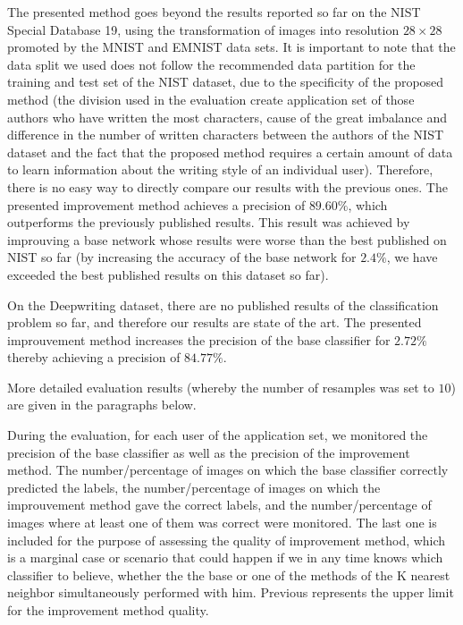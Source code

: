 \documentclass{article}
\begin{document}
The presented method goes beyond the results reported so far on the NIST Special Database 19, using the transformation of images into resolution $28 \times 28$ promoted by the MNIST and EMNIST data sets. 
It is important to note that the data split we used does not follow the recommended data partition for the training and test set of the NIST dataset, due to the specificity of the proposed method 
(the division used in the evaluation create application set of those authors who have written the most characters, cause of the great imbalance and difference 
in the number of written characters between the authors of the NIST dataset and 
the fact that the proposed method requires a certain amount of data to learn information about the writing style of an individual user). 
Therefore, there is no easy way to directly compare our results with the previous ones. %
The presented improvement method achieves a precision of $89.60\%$, which outperforms the previously published results. 
This result was achieved by improuving a base network whose results were worse than the best published on NIST so far 
(by increasing the accuracy of the base network for $2.4\%$, we have exceeded the best published results on this dataset so far). 

On the Deepwriting dataset, there are no published results of the classification problem so far, and therefore our results are state of the art. 
The presented improuvement method increases the precision of the base classifier for $2.72\%$ thereby achieving a precision of $84.77\%$. 

More detailed evaluation results (whereby the number of resamples was set to $10$) are given in the paragraphs below. 

During the evaluation, for each user of the application set, we monitored the precision of the base classifier as well as the precision of the improvement method.  
The number/percentage of images on which the base classifier correctly predicted the labels, the number/percentage of images on which the improuvement method gave the correct labels, 
and the number/percentage of images where at least one of them was correct were monitored. 
The last one is included for the purpose of assessing the quality of improvement method, 
which is a marginal case or scenario that could happen if we in any time knows which classifier to believe, 
whether the the base or one of the methods of the K nearest neighbor simultaneously performed with him. 
Previous represents the upper limit for the improvement method quality.
\end{document}
